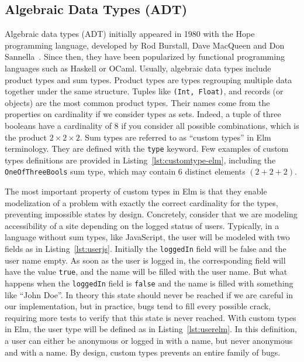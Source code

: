 


\subsection{Algebraic Data Types (ADT)}%
\label{sub:algebraic_data_types_adt_}

Algebraic data types (ADT) initially appeared in 1980 with the Hope programming language,
developed by Rod Burstall, Dave MacQueen and Don Sannella~\cite{burstall1980hope}.
Since then, they have been popularized by functional programming languages
such as Haskell or OCaml.
Usually, algebraic data types include product types and sum types.
Product types are types regrouping multiple data together under the same structure.
Tuples like \verb|(Int, Float)|, and records (or objects) are the most common product types.
Their names come from the properties on cardinality if we consider types as sets.
Indeed, a tuple of three booleans have a cardinality of 8 if you consider
all possible combinations, which is the product $2\times2\times2$.
Sum types are referred to as ``custom types'' in Elm terminology.
They are defined with the \verb|type| keyword.
Few examples of custom types definitions are provided in Listing~\ref{lst:customtype-elm},
including the \verb|OneOfThreeBools| sum type,
which may contain 6 distinct elements $(2 + 2 + 2)$.



The most important property of custom types in Elm
is that they enable modelization of a problem with exactly the correct
cardinality for the types, preventing impossible states by design.
Concretely, consider that we are modeling accessibility of a site
depending on the logged status of users.
Typically, in a language without sum types, like JavaScript,
the user will be modeled with two fields as in Listing~\ref{lst:userjs}.
Initially the \verb|loggedIn| field will be false and the user name empty.
As soon as the user is logged in,
the corresponding field will have the value \verb|true|,
and the name will be filled with the user name.
But what happens when the \verb|loggedIn| field is \verb|false| and
the name is filled with something like ``John Doe''.
In theory this state should never be reached if we are careful in our implementation,
but in practice, bugs tend to fill every possible crack,
requiring more tests to verify that this state is never reached.
With custom types in Elm, the user type will be defined as in Listing~\ref{lst:userelm}.
In this definition, a user can either be anonymous or logged in with a name,
but never anonymous and with a name.
By design, custom types prevents an entire family of bugs.

